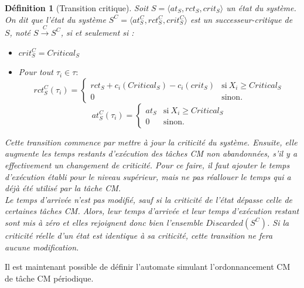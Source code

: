 \documentclass[12pt,a4paper,oneside]{book}
\theoremstyle{break}
\newtheorem{defin}{Définition}[chapter]
\theoremstyle{breakplain}
\begin{document}
\pagebreak

\begin{defin}[Transition critique]
Soit $S = \langle at_S, rct_S, crit_S \rangle$ un état du système. On dit que l'état du système $S^C = \langle at_S^C, rct_S^C, crit_S^C \rangle$ est un \textit{successeur-critique} de $S$, noté $S\xrightarrow{C}S^C$, si et seulement si :
\begin{itemize}
\item $crit_S^C = Critical_S$
\item Pour tout $\tau_i \in \tau :$
$$ rct_S^C(\tau_i) = \left\{
    \begin{array}{ll}
        rct_S+c_i(Critical_S)-c_i(crit_S) & \mbox{si}\ X_i\geq Critical_S\\
        0 & \mbox{sinon.}
    \end{array}
\right.
$$
$$ at_S^C(\tau_i) = \left\{
    \begin{array}{ll}
        at_S & \mbox{si}\ X_i\geq Critical_S \\
        0 & \mbox{sinon.}
    \end{array}
\right.
$$
\end{itemize}

Cette transition commence par mettre à jour la criticité du système. Ensuite, elle augmente les temps restants d'exécution des tâches CM non abandonnées, s'il y a effectivement un changement de criticité. Pour ce faire, il faut ajouter le temps d'exécution établi pour le niveau supérieur, mais ne pas réallouer le temps qui a déjà été utilisé par la tâche CM.\\

Le temps d'arrivée n'est pas modifié, sauf si la criticité de l'état dépasse celle de certaines tâches CM. Alors, leur temps d'arrivée et leur temps d'exécution restant sont mis à zéro et elles rejoignent donc bien l'ensemble $Discarded(S^C)$. Si la criticité réelle d'un état est identique à sa criticité, cette transition ne fera aucune modification.
\end{defin}

Il est maintenant possible de définir l'automate simulant l'ordonnancement CM de tâche CM périodique.\\
\end{document}
